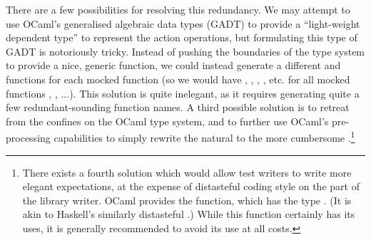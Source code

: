 There are a few possibilities for resolving this redundancy. We may
attempt to use OCaml's generalised algebraic data types (GADT) to
provide a ``light-weight dependent type'' to represent the action
operations, but formulating this type of GADT is notoriously
tricky. Instead of pushing the boundaries of the type system to
provide a nice, generic  function, we could instead
generate a different  and  functions for each
mocked function (so we would have , ,
, , etc. for all mocked functions
, , ...). This solution is quite inelegant, as it
requires generating quite a few redundant-sounding function names. A
third possible solution is to retreat from the confines on the OCaml
type system, and to further use OCaml's pre-processing capabilities to
simply rewrite the natural  to the more
cumbersome .\footnote{There exists a fourth
  solution which would allow test writers to write more elegant
  expectations, at the expense of distasteful coding style on the part
  of the library writer. OCaml provides the 
  function, which has the type . (It is akin
  to Haskell's similarly distasteful .) While
  this function certainly has its uses, it is generally recommended to
  avoid its use at all costs.}




